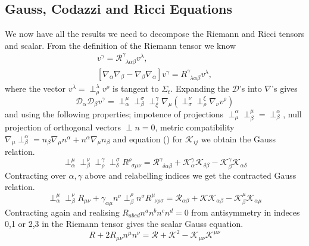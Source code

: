 \documentclass[11pt, oneside]{report}  %
\newcommand{\K}{\mathcal{K}}
\numberwithin{equation}{section}
\begin{document}
\subsection{Gauss, Codazzi and Ricci Equations}
We now have all the results we need to decompose the Riemann and Ricci tensors and scalar. From the definition of the Riemann tensor we know
\begin{gather*} [\mathcal{D}_\alpha\mathcal{D}_\beta-\mathcal{D}_\beta\mathcal{D}_\alpha]v^\gamma = \mathcal{R}^\gamma_{\,\,\,\lambda \alpha\beta}v^\lambda, \\
 [\nabla_\alpha\nabla_\beta-\nabla_\beta\nabla_\alpha]v^\gamma = {R}^\gamma_{\,\,\,\lambda \alpha\beta}v^\lambda, \end{gather*}
where the vector $v^\lambda = \perp^\lambda_\rho v^\rho$ is tangent to $\Sigma_t$. Expanding the $\mathcal{D}$'s into $\nabla$'s gives
\begin{equation} \mathcal{D}_\alpha \mathcal{D}_\beta v^\gamma = \perp^\mu_\alpha \perp_\beta^\sigma \perp^\gamma_\xi \nabla_\mu(\perp^\nu_\sigma \perp^\xi_\rho \nabla_\nu v^\rho)\end{equation}
and using the following properties; impotence of projections $\perp^\alpha_\mu \perp^\mu_\beta = \perp^\alpha_\beta$, null projection of orthogonal vectors $\perp n =0$, metric compatibility $\nabla_\mu \perp^\alpha_\beta = n_\beta\nabla_\mu n^\alpha + n^\alpha \nabla_\mu n_\beta$ and equation () for $\K_{ij}$ we obtain the Gauss relation.
\begin{equation} \perp^\mu_\alpha \perp^\nu_\beta \perp^\gamma_\rho \perp^\sigma_\delta R^{\rho}_{\,\,\,\sigma\mu\nu} = \mathcal{R}^\gamma_{\,\,\,\delta\alpha\beta} + \mathcal{K}^\gamma_\alpha \mathcal{K}_{\delta\beta} - \mathcal{K}^\gamma_\beta \mathcal{K}_{\alpha\delta}  \end{equation}
Contracting over $\alpha,\gamma$ above and relabelling indices we get the contracted Gauss relation.
\begin{equation} \perp^\mu_\alpha \perp^\nu_\beta R_{\mu\nu} + \gamma_{\alpha\mu}n^\nu\perp^\rho_\beta n^\sigma R^\mu_{\,\,\,\nu\rho\sigma} = \mathcal{R}_{\alpha\beta} + \mathcal{K} \mathcal{K}_{\alpha\beta} - \mathcal{K}^\mu_\beta \mathcal{K}_{\alpha\mu}  \end{equation}
Contracting again and realising $R_{abcd}n^an^bn^cn^d=0$ from antisymmetry in indeces 0,1 or 2,3 in the Riemann tensor gives the scalar Gauss equation.
\begin{equation}R + 2R_{\mu\nu}n^\mu n^\nu = \mathcal{R} + \mathcal{K}^2 - \mathcal{K}_{\mu\nu}\mathcal{K}^{\mu\nu}\end{equation}
\end{document}

